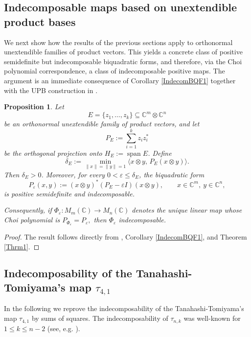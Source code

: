 \documentclass[12pt,a4paper]{amsart}
\theoremstyle{plain}
\newtheorem{proposition}[theorem]{Proposition}
\theoremstyle{remark}
\theoremstyle{definition}
\begin{document}
\subsection{Indecomposable maps based on unextendible product bases}

We next show how the results of the previous sections apply to orthonormal unextendible families of product vectors. This yields a concrete class of positive semidefinite but indecomposable biquadratic forms, and therefore, via the Choi polynomial correspondence, a class of indecomposable positive maps. The argument is an immediate consequence of Corollary \ref{IndecomBQF1} together with the UPB construction in \cite[Theorem~3]{Terhal01}.

\begin{proposition}
Let
\[
E=\{z_1,\dots,z_k\}\subseteq \mathbb C^m\otimes \mathbb C^n
\]
be an orthonormal unextendible family of product vectors, and let
\[
P_E:=\sum_{i=1}^k z_i z_i^*
\]
be the orthogonal projection onto \(H_E:=\operatorname{span}E\). Define
\[
\delta_E:=\min_{\|x\|=\|y\|=1}\langle x\otimes y,\,P_E(x\otimes y)\rangle.
\]
Then \(\delta_E>0\). Moreover, for every \(0<\varepsilon\le \delta_E\), the biquadratic form
\[
P_\varepsilon(x,y):=(x\otimes y)^*(P_E-\varepsilon I)(x\otimes y),
\qquad x\in\mathbb C^m,\ y\in\mathbb C^n,
\]
is positive semidefinite and indecomposable.

Consequently, if \(\Phi_\varepsilon:M_m(\mathbb C)\to M_n(\mathbb C)\) denotes the unique linear map whose Choi polynomial is
$P_{\Phi_\varepsilon}=P_\varepsilon,$
then \(\Phi_\varepsilon\) indecomposable.
\end{proposition}

\begin{proof}
The result follows directly from \cite[Theorem~3]{Terhal01}, Corollary \ref{IndecomBQF1}, and Theorem \ref{Thrm1}.
\end{proof}






\subsection{Indecomposability of the Tanahashi-Tomiyama's map $\tau_{4,1}$}


In the following we reprove the indecomposability of the Tanahashi-Tomiyama's map $\tau_{4,1}$ by sums of squares. The indecomposability of $\tau_{n,k}$ was well-known for $1\leq k \leq n-2$ (see, e.g. \cite{Tomiyama1988, Osaka91, Osaka93, Yamagami93, Ha98}).
\end{document}
